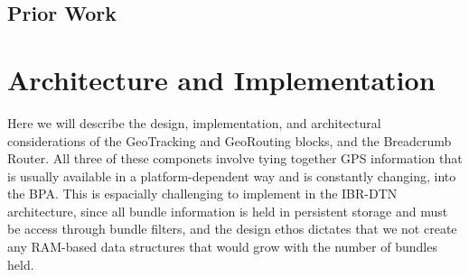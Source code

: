 \documentclass{sig-alternate}
\begin{document}
\CopyrightYear
\crdata








\subsection {Prior Work}


%
%




%
%
\section{Architecture and Implementation}

Here we will describe the design, implementation, and architectural considerations of the GeoTracking and GeoRouting blocks, and the Breadcrumb Router.  All three of these componets involve tying together GPS information that is usually available in a platform-dependent way and is constantly changing, into the BPA.  This is espacially challenging to implement in the IBR-DTN architecture, since all bundle information is held in persistent storage and must be access through bundle filters, and the design ethos dictates that we not create any RAM-based data structures that would grow with the number of bundles held.










%
%

\end{document}
